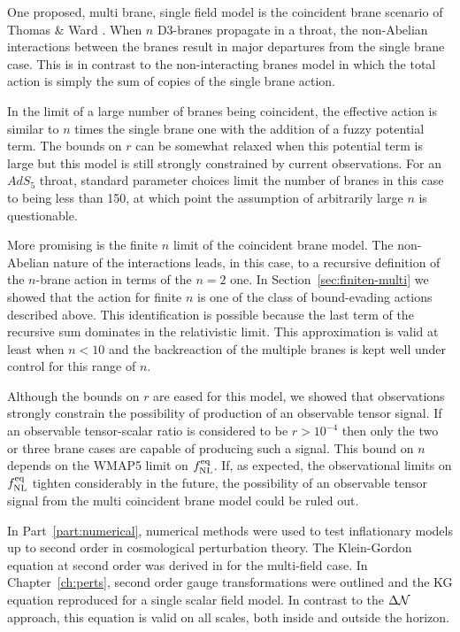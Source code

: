 One proposed, multi brane, single field model is the coincident brane scenario of
Thomas \& Ward \cite{thomasward}. When $n$ D3-branes propagate in a throat, the
non-Abelian interactions between the branes result in major departures from the
single brane case. This is in contrast to the non-interacting branes model in which
the total action is simply the sum of copies of the single brane action.

In the limit of a large number of branes being coincident, the effective action is
similar to $n$ times the single brane one with the addition of a fuzzy potential
term. The bounds on $r$ can be somewhat relaxed when this potential term is large
but this model is still strongly constrained by current observations. For an $AdS_5$
throat, standard parameter choices limit the number of branes in this case to being
less than 150, at which point the assumption of arbitrarily large $n$ is
questionable.

More promising is the finite $n$ limit of the coincident brane model. The
non-Abelian nature of the interactions leads, in this case, to a recursive definition
of the $n$-brane action in terms of the $n=2$ one. In
Section~\ref{sec:finiten-multi} we showed that the action for finite $n$ is one of
the class of bound-evading actions described above. This identification is possible
because the last term of the recursive sum dominates in the relativistic limit. This
approximation is valid at least when $n<10$ and the backreaction of the multiple
branes is kept well under control for this range of $n$.

Although the bounds on $r$ are eased
for this model, we showed that observations strongly constrain the possibility of
production of an observable tensor signal. If an observable tensor-scalar ratio is
considered to be $r>10^{-4}$ then only the two or three brane cases are capable of
producing such a signal. This bound on $n$ depends on the WMAP5 limit on $f_{\mathrm{NL}}^{\mathrm{eq}}$.
If, as expected, the observational limits on $f_{\mathrm{NL}}^{\mathrm{eq}}$ tighten considerably in the
future, the possibility of an observable tensor signal from the multi coincident
brane model could be ruled out.

In Part~\ref{part:numerical}, numerical methods were used to test inflationary
models up to second order in cosmological perturbation theory. The Klein-Gordon
equation at second order was derived in  for the multi-field
case. In Chapter~\ref{ch:perts}, second order gauge transformations were outlined
and the KG equation reproduced for a single scalar field model. In contrast to the
$\Delta \mathcal{N}$ approach, this equation is valid on all scales, both inside and outside
the horizon. 

